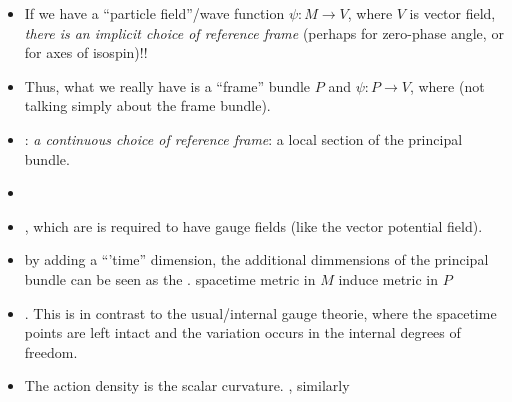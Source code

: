 \documentclass[12pt]{report}
\begin{document}
\begin{itemize}
    \item If we have a ``particle field''/wave function $\psi:M \to V$, where $V$ is vector field, \emph{there is an implicit choice of reference frame} (perhaps for zero-phase angle, or for axes of isospin)!!
    
    \item Thus, what we really have is a ``frame'' bundle $P$ and $\psi:P \to V$, where  (not talking simply about the frame bundle).

    \item {}: \emph{a continuous choice of reference frame}: a local section of the principal bundle. 
    
    \item {}
    
    \item {}, which are is required to have gauge fields (like the vector potential field).
    
    \item {} by adding a ``'time'' dimension, the additional dimmensions of the principal bundle can be seen as the .  \small{spacetime metric in $M$  induce metric in $P$} 
    
    \item {}. This is in contrast to the usual/internal gauge theorie, where the spacetime points are left intact and the variation occurs in the internal degrees of freedom.
    
    \item The action density is the scalar curvature. , similarly 
\end{itemize}
\end{document}
